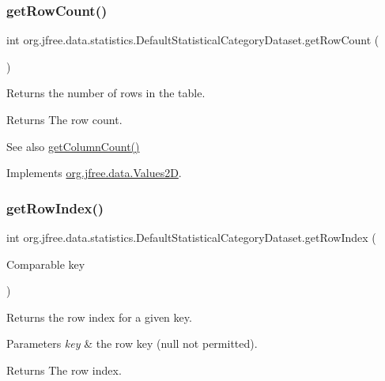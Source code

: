 \subsubsection{\texorpdfstring{get\+Row\+Count()}{getRowCount()}}
{\footnotesize\ttfamily int org.\+jfree.\+data.\+statistics.\+Default\+Statistical\+Category\+Dataset.\+get\+Row\+Count (\begin{DoxyParamCaption}{ }\end{DoxyParamCaption})}

Returns the number of rows in the table.

\begin{DoxyReturn}{Returns}
The row count.
\end{DoxyReturn}
\begin{DoxySeeAlso}{See also}
\mbox{\hyperlink{classorg_1_1jfree_1_1data_1_1statistics_1_1_default_statistical_category_dataset_a7902055e97297ac0e6a62506cbce677e}{get\+Column\+Count()}} 
\end{DoxySeeAlso}


Implements \mbox{\hyperlink{interfaceorg_1_1jfree_1_1data_1_1_values2_d_a9ce939b45128515a9841a7d018a6ad0e}{org.\+jfree.\+data.\+Values2D}}.

\mbox{\label{classorg_1_1jfree_1_1data_1_1statistics_1_1_default_statistical_category_dataset_ad9d326f8427acc2ccda08946308fa12f}} 
\subsubsection{\texorpdfstring{get\+Row\+Index()}{getRowIndex()}}
{\footnotesize\ttfamily int org.\+jfree.\+data.\+statistics.\+Default\+Statistical\+Category\+Dataset.\+get\+Row\+Index (\begin{DoxyParamCaption}\item[{Comparable}]{key }\end{DoxyParamCaption})}

Returns the row index for a given key.


\begin{DoxyParams}{Parameters}
{\em key} & the row key ({\ttfamily null} not permitted).\\
\hline
\end{DoxyParams}
\begin{DoxyReturn}{Returns}
The row index. 
\end{DoxyReturn}


